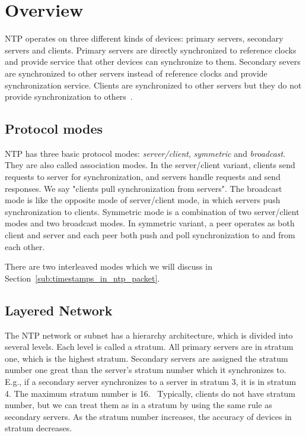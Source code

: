 
\chapter{Overview}
NTP operates on three different kinds of devices: primary servers, secondary
servers and clients. Primary servers are directly synchronized to reference
clocks and provide service that other devices can synchronize to them.
Secondary severs are synchronized to other servers instead of reference clocks
and provide synchronization service. Clients are synchronized to other servers
but they do not provide synchronization to others~\cite{rfc5905}.

\section{Protocol modes}%
\label{sec:protocol_modes}
NTP has three basic protocol modes: \emph{server/client}, \emph{symmetric}
and \emph{broadcast}. They are also called association modes. 
In the server/client variant, clients send requests to server for
synchronization, and servers handle requests and send responses. We say
"clients pull synchronization from servers". The broadcast mode is like the
opposite mode of server/client mode, in which servers push synchronization to
clients. Symmetric mode is a combination of two server/client modes and two
broadcast modes. In symmetric variant, a peer operates as both client and
server and each peer both push and poll synchronization to and from each
other.~\cite{rfc5905}

There are two interleaved modes which we will discuss in
Section~\ref{sub:timestamps_in_ntp_packet}.

\section{Layered Network}
\label{sec:Layered_network}
The NTP network or subnet has a hierarchy architecture, which is divided into
several levels. Each level is called a stratum. All primary servers are in
stratum one, which is the highest stratum. Secondary servers are assigned the
stratum number one great than the server's stratum number which it synchronizes
to. E.g., if a secondary server synchronizes to a server in stratum 3, it is in
stratum 4. The maximum stratum number is 16.~\cite{rfc5905}
Typically, clients do not have stratum number, but we can treat them
as in a stratum by using the same rule as secondary servers.
As the stratum number increases, the accuracy of devices in stratum
decreases.

